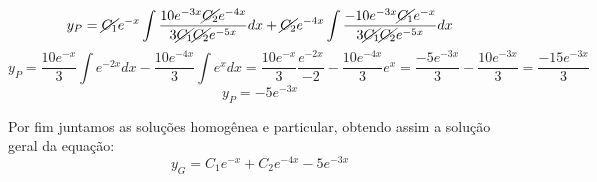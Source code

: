 \begin{equation*}
    y_P = \cancel{C_1}e^{-x}\int \frac{10e^{-3x}\cancel{C_2}e^{-4x}}{3\cancel{C_1}\cancel{C_2}e^{-5x}} dx + \cancel{C_2}e^{-4x}\int \frac{-10e^{-3x}\cancel{C_1}e^{-x}}{3\cancel{C_1}\cancel{C_2}e^{-5x}}dx
\end{equation*}
\begin{equation*}
    y_P = \frac{10e^{-x}}{3}\int e^{-2x} dx - \frac{10e^{-4x}}{3} \int e^x dx = \frac{10e^{-x}}{3}\frac{e^{-2x}}{-2} - \frac{10e^{-4x}}{3}e^x = \frac{-5e^{-3x}}{3} - \frac{10e^{-3x}}{3} = \frac{-15e^{-3x}}{3}
\end{equation*}
\begin{equation*}
    y_P = -5e^{-3x}
\end{equation*}

Por fim juntamos as soluções homogênea e particular, obtendo assim a solução geral da equação:
\begin{equation*}
    \boxed{y_G = C_1e^{-x} + C_2e^{-4x} -5e^{-3x}} 
\end{equation*}